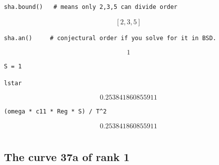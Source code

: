 \documentclass{book}
\begin{document}
\begin{lstlisting}
sha.bound()   # means only 2,3,5 can divide order
\end{lstlisting}$$\left[2, 3, 5\right]$$
\begin{lstlisting}
sha.an()     # conjectural order if you solve for it in BSD.
\end{lstlisting}$$1$$
\begin{lstlisting}
S = 1
\end{lstlisting}
\begin{lstlisting}
lstar
\end{lstlisting}$$0.253841860855911$$
\begin{lstlisting}
(omega * c11 * Reg * S) / T^2
\end{lstlisting}$$0.253841860855911$$


\begin{lstlisting}
\end{lstlisting}\subsection{The curve 37a of rank 1}
\end{document}

